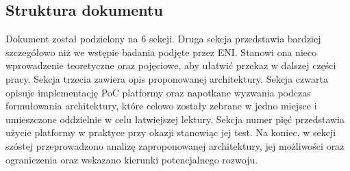 \subsection{Struktura dokumentu}

Dokument został podzielony na 6 sekcji. Druga sekcja przedstawia bardziej szczegółowo niż we wstępie badania podjęte przez ENI. Stanowi ona nieco wprowadzenie teoretyczne oraz pojęciowe, aby ułatwić przekaz w dalszej części pracy. Sekcja trzecia zawiera opis proponowanej architektury. Sekcja czwarta opisuje implementację PoC platformy oraz napotkane wyzwania podczas formułowania architektury, które celowo zostały zebrane w jedno miejsce i umieszczone oddzielnie w celu łatwiejszej lektury. Sekcja numer pięć przedstawia użycie platformy w praktyce przy okazji stanowiąc jej test. Na koniec, w sekcji szóstej przeprowadzono analizę zaproponowanej architektury, jej możliwości oraz ograniczenia oraz wskazano kierunki potencjalnego rozwoju.